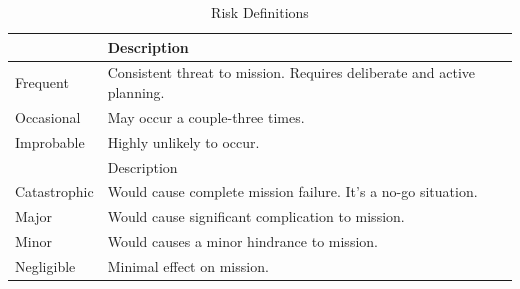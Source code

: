 \begin{table}[hb!]
\centering
\caption{Risk Definitions}
\label{Tab:rd}
\begin{tabular}{ l l }
    \rowcolor{gray!50}{Risk Probability & Description}\\ \hline
    Frequent & Consistent threat to mission. Requires deliberate and active planning. \\
    Occasional& May occur a couple-three times.\\
    Improbable & Highly unlikely to occur.\\[.1in]
    \rowcolor{gray!50}{Risk Severity & Description}\\ \hline
    Catastrophic   & Would cause complete mission failure. It's a no-go situation.\\
    Major         & Would cause significant complication to mission.\\
    Minor         & Would causes a minor  hindrance to mission.\\
    Negligible    & Minimal effect on mission.        
\end{tabular}
\end{table}
\vspace{1.5cm}
